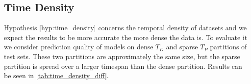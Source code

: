 \subsection{Time Density}
\label{sec:time_density_experiment}

Hypothesis \autoref{hyp:time_density} concerns the temporal density of datasets and we expect the results to be more accurate the more dense the data is.
To evaluate it we consider prediction quality of models on dense $T_D$ and sparse $T_P$ partitions of test sets. These two partitions are approximately the same size, but the sparse partition is spread over a larger timespan than the dense partition. Results can be seen in \autoref{tab:time_density_diff}.



